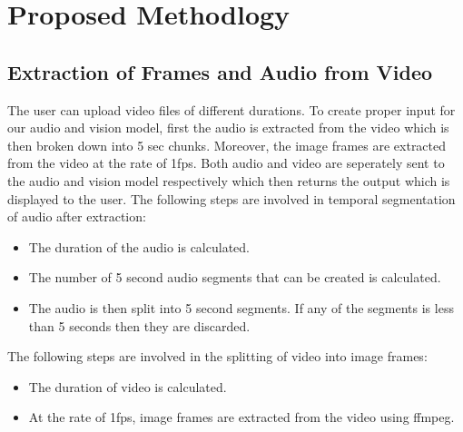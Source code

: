 \documentclass[fleqn, 10pt, twoside]{IOEGC}
\begin{document}
\section{Proposed Methodlogy}
\subsection{Extraction of Frames and Audio from Video}
The user can upload video files of different durations. To create proper input for our audio and vision model, first the audio is extracted from the video which is then broken down into 5 sec chunks. Moreover, the image frames are extracted from the video at the rate of 1fps. Both audio and video are seperately sent to the audio and vision model respectively which then returns the output which is displayed to the user.
The following steps are involved in temporal segmentation of audio after extraction:
\begin{itemize}
	\item {The duration of the audio is calculated.}
	      \item{The number of 5 second audio segments that can be created is calculated. }
	\item { The audio is then split into 5 second segments. If any of the segments is less than 5 seconds then they are discarded. }
\end{itemize}
The following steps are involved in the splitting of video into image frames:
\begin{itemize}
	\item {The duration of video is calculated.}
	      \item{At the rate of 1fps, image frames are extracted from the video using ffmpeg.}
\end{itemize}
\end{document}
